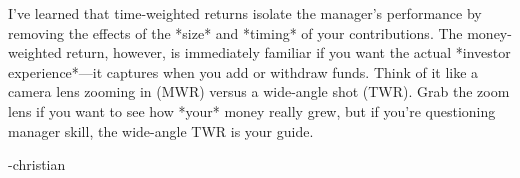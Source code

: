 \begin{infobox}

I’ve learned that time-weighted returns isolate the manager’s performance by removing the effects of the *size* and *timing* of your contributions. The money-weighted return, however, is immediately familiar if you want the actual *investor experience*—it captures when you add or withdraw funds. Think of it like a camera lens zooming in (MWR) versus a wide-angle shot (TWR). Grab the zoom lens if you want to see how *your* money really grew, but if you’re questioning manager skill, the wide-angle TWR is your guide.

-christian

\end{infobox}
